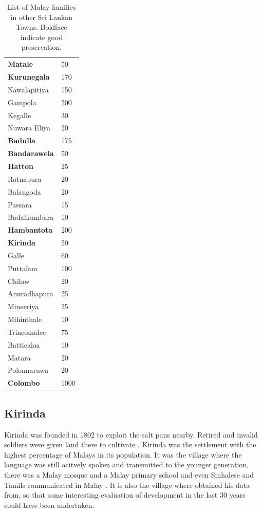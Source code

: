 \begin{table}
	\centering
		\begin{tabular}{ll}
		 \textbf{Matale}	& 50	\\
		 \textbf{Kurunegala}	& 170	\\
		 Nawalapitiya	& 150	\\
		 Gampola	& 200	\\
		 Kegalle	& 30	\\
		 Nuwara Eliya	& 20	\\
		 \textbf{Badulla} 	& 175	\\
		 \textbf{Bandarawela}	& 50	\\
		 \textbf{Hatton}	& 25 \\
		 Ratnapura	& 20	\\
		 Balangoda	& 20 \\
		 Passara	& 15 \\
		 Badalkumbara	& 10	\\
		 \textbf{Hambantota}	& 200	\\
		 \textbf{Kirinda}	& 50	\\
		 Galle	& 60\\
		 Puttalam	& 100	\\
		 Chilaw	& 20	\\
		 Anuradhapura	& 25 \\
		 Mineeriya & 25	\\
		 Mihinthale	& 10 \\
		 Trincomalee	& 75	\\
		 Batticaloa & 10	\\
		 Matara	& 20	\\
		 Polonnaruwa & 20 \\
		 \textbf{Colombo} & 1000\\
		\end{tabular}
	\caption[List of Malay families in Sri Lankan Towns]{List of Malay families in other Sri Lankan Towns. Boldface indicate good preservation.}
	\label{tab:ListOfMalayFamiliesInOtherSriLankanTowns}
\end{table}

\subsection{Kirinda}\label{sec:slmbg:Kirinda}
Kirinda was founded in 1802 to exploit the salt pans nearby. Retired and invalid soldiers were given land there to cultivate \citet[63]{Hussainmiya1990}.
Kirinda was  the  settlement with the highest percentage of Malays in its population. It was the village where the language was still acitvely spoken and transmitted to the younger generation, there was a Malay mosque and a Malay primary school and even Sinhalese and Tamils communicated in Malay \citet{Ansaldo2005kirinda}. It is also the village where \citet{Smith1979} obtained his data from, so that some interesting evaluation of development in the last 30 years could have been undertaken.

